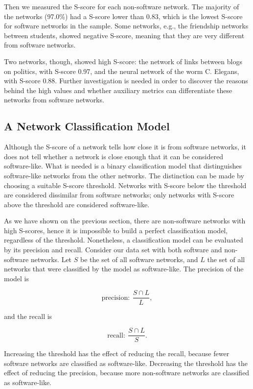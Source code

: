 
Then we measured the S-score for each non-software network. The majority of the
networks (97.0\%) had a S-score lower than 0.83, which is the lowest S-score for
software networks in the sample. Some networks, e.g., the friendship networks
between students, showed negative S-score, meaning that they are very different
from software networks.

Two networks, though, showed high S-score: the network of links between blogs on
politics, with S-score 0.97, and the neural network of the worm C. Elegans, with
S-score 0.88. Further investigation is needed in order to discover the reasons
behind the high values and whether auxiliary metrics can differentiate these
networks from software networks.

\subsection{A Network Classification Model} \label{sec:classmodel}

Although the S-score of a network tells how close it is from software networks,
it does not tell whether a network is close enough that it can be considered
software-like. What is needed is a binary classification model that
distinguishes software-like networks from the other networks. The distinction
can be made by choosing a suitable S-score threshold. Networks with S-score
below the threshold are considered dissimilar from software networks; only
networks with S-score above the threshold are considered software-like. 

As we have shown on the previous section, there are non-software networks with
high S-scores, hence it is impossible to build a perfect classification model,
regardless of the threshold. Nonetheless, a classification model can be
evaluated by its precision and recall. Consider our data set with both software
and non-software networks. Let $S$ be the set of all software networks, and $L$
the set of all networks that were classified by the model as software-like. The
precision of the model is

$$
\mathrm{precision}: ~\frac{S \cap L}{L},
$$

and the recall is

$$
\mathrm{recall}: ~\frac{S \cap L}{S}.
$$

Increasing the threshold has the effect of reducing the recall, because fewer
software networks are classified as software-like. Decreasing the threshold has
the effect of reducing the precision, because more non-software networks are
classified as software-like. 

